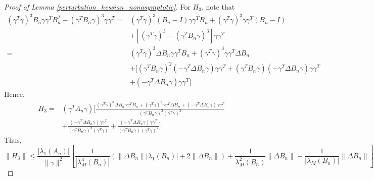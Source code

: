 \documentclass{article} \usepackage{iclr2019_conference,times}
\begin{document}
\begin{proof}[Proof of Lemma \ref{perturbation_hessian_nonasymptotic}]
For $H_3$, note that
\begin{equation}
\begin{split}
    (\gamma^T \gamma)^3 B_n \gamma \gamma^T B_n^T - (\gamma^T B_n \gamma)^3 \gamma \gamma^T =& 
    (\gamma^T \gamma)^3 (B_n - I) \gamma \gamma^T B_n + (\gamma^T \gamma)^3 \gamma \gamma^T (B_n - I)\\
    & + [(\gamma^T \gamma)^3 - (\gamma^T B_n \gamma)^3] \gamma \gamma^T \\
    =& (\gamma^T \gamma)^3 \Delta B_n \gamma \gamma^T B_n + (\gamma^T \gamma)^3 \gamma \gamma^T \Delta B_n \\
    & + [(\gamma^T B_n \gamma)^2 (-\gamma^T \Delta B_n \gamma) \gamma \gamma^T + (\gamma^T B_n \gamma) (-\gamma^T \Delta B_n \gamma) \gamma \gamma^T \\
    & + (-\gamma^T \Delta B_n \gamma) \gamma \gamma^T]
\end{split}
\end{equation}
Hence, 
\begin{equation}
    \begin{split}
        H_3 =& (\gamma^T A_n \gamma) \Big[\frac{(\gamma^T \gamma)^3 \Delta B_n \gamma \gamma^T B_n + (\gamma^T \gamma)^3 \gamma \gamma^T \Delta B_n + (-\gamma^T \Delta B_n \gamma) \gamma \gamma^T}{(\gamma^T B_n \gamma)^3 (\gamma^T \gamma)^3} \\
        & + \frac{(-\gamma^T \Delta B_n \gamma) \gamma \gamma^T}{(\gamma^T B_n \gamma)^2(\gamma^T \gamma)} + \frac{(-\gamma^T \Delta B_n \gamma) \gamma \gamma^T}{(\gamma^T B_n \gamma)(\gamma^T \gamma)^2}\Big]
    \end{split}
\end{equation}
Thus, 
\begin{equation}
    \|H_3\| \leq \frac{|\lambda_1(A_n)|}{\| \gamma \|^2} \left[\frac{1}{|\lambda_M^3(B_n)|}(\| \Delta B_n \| |\lambda_1(B_n)| + 2 \| \Delta B_n \|) + \frac{1}{\lambda_M^2(B_n)} \| \Delta B_n\| + \frac{1}{|\lambda_M(B_n)|}\| \Delta B_n \|\right]
\end{equation}


\end{proof}
\end{document}
